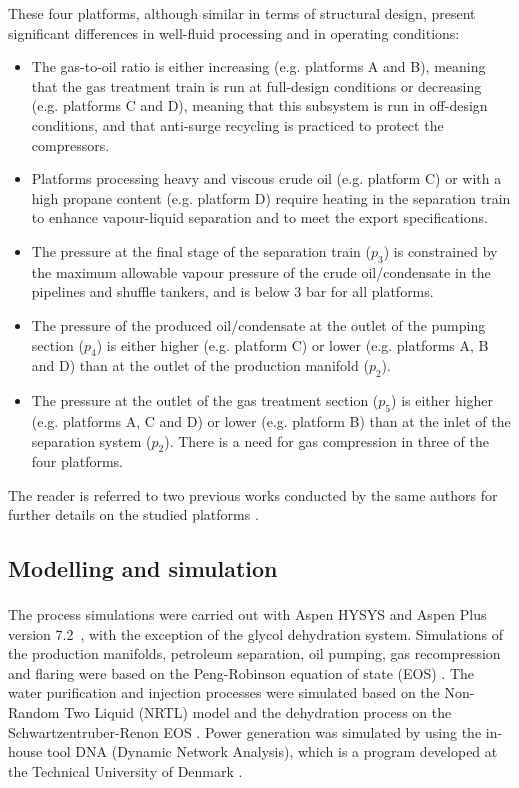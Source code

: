 \documentclass[times,3p]{elsarticle}
\begin{document}
These four platforms, although similar in terms of structural design, present significant differences in well-fluid processing and in operating conditions: 

\begin{itemize}
	\item The gas-to-oil ratio is either increasing (e.g. platforms A and B), meaning that the gas treatment train is run at full-design conditions or decreasing (e.g. platforms C and D), meaning that this subsystem is run in off-design conditions, and that anti-surge recycling is practiced to protect the compressors.
	\item Platforms processing heavy and viscous crude oil (e.g. platform C) or with a high propane content (e.g. platform D) require heating in the separation train to enhance vapour-liquid separation and to meet the export specifications.
	\item The pressure at the final stage of the separation train ($p_3$) is constrained by the maximum allowable vapour pressure of the crude oil/condensate in the pipelines and shuffle tankers, and is below 3 bar for all platforms.
	\item The pressure of the produced oil/condensate at the outlet of the pumping section ($p_4$) is either higher (e.g. platform C) or lower (e.g. platforms A, B and D) than at the outlet of the production manifold ($p_2$).
	\item The pressure at the outlet of the gas treatment section ($p_5$) is either higher (e.g. platforms A, C and D) or lower (e.g. platform B) than at the inlet of the separation system ($p_2$). There is a need for gas compression in three of the four platforms. 
\end{itemize} 

The reader is referred to two previous works conducted by the same authors for further details on the studied platforms \cite{Voldsund2013,Voldsund2013b}. 

\subsection{Modelling and simulation}

The process simulations were carried out with Aspen HYSYS\textsuperscript{\tiny\textregistered} \cite{Guide2004} and Aspen Plus\textsuperscript{\tiny\textregistered} version 7.2\ \cite{Technology1999}, with the exception of the glycol dehydration system. Simulations of the production manifolds, petroleum separation, oil pumping, gas recompression and flaring were based on the Peng-Robinson equation of state (EOS) \cite{Peng1976}. The water purification and injection processes were simulated based on the Non-Random Two Liquid (NRTL) model \cite{Renon1968} and the dehydration process on the Schwartzentruber-Renon EOS \cite{Schwartzentruber1989a,Schwartzentruber1989b}. Power generation was simulated by using the in-house tool DNA (Dynamic Network Analysis), which is a program developed at the Technical University of Denmark \cite{Elmegaard2005}. 
\end{document}
